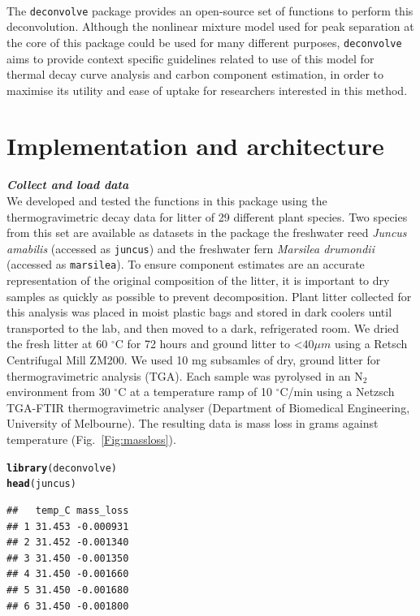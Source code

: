 \documentclass{jors}\usepackage[]{graphicx}\usepackage[]{color}
\makeatletter
\newcommand{\hlstd}[1]{\textcolor[rgb]{0.345,0.345,0.345}{#1}}%
\newcommand{\hlkwd}[1]{\textcolor[rgb]{0.737,0.353,0.396}{\textbf{#1}}}%
\newenvironment{kframe}{%
 \def\at@end@of@kframe{}%
 \ifinner\ifhmode%
  \def\at@end@of@kframe{\end{minipage}}%
  \begin{minipage}{\columnwidth}%
 \fi\fi%
 \def\FrameCommand##1{\hskip\@totalleftmargin \hskip-\fboxsep
 \colorbox{shadecolor}{##1}\hskip-\fboxsep
     \hskip-\linewidth \hskip-\@totalleftmargin \hskip\columnwidth}%
 \MakeFramed {\advance\hsize-\width
   \@totalleftmargin\z@ \linewidth\hsize
   \@setminipage}}%
 {\par\unskip\endMakeFramed%
 \at@end@of@kframe}
\newenvironment{knitrout}{}{} %
\makeatother
\begin{document}
\\
The \verb|deconvolve| package provides an open-source set of functions to perform this deconvolution. Although the nonlinear mixture model used for peak separation at the core of this package could be used for many different purposes, \verb|deconvolve| aims to provide context specific guidelines related to use of this model for thermal decay curve analysis and carbon component estimation, in order to maximise its utility and ease of uptake for researchers interested in this method.

\section*{Implementation and architecture}

\textbf{\textit{Collect and load data}}\\
We developed and tested the functions in this package using the thermogravimetric decay data for litter of 29 different plant species. Two species from this set are available as datasets in the package \textemdash the freshwater reed \textit{Juncus amabilis} (accessed as \verb|juncus|) and the freshwater fern \textit{Marsilea drumondii} (accessed as \verb|marsilea|). To ensure component estimates are an accurate representation of the original composition of the litter, it is important to dry samples as quickly as possible to prevent decomposition. Plant litter collected for this analysis was placed in moist plastic bags and stored in dark coolers until transported to the lab, and then moved to a dark, refrigerated room. We dried the fresh litter at 60 $^{\circ}$C for 72 hours and ground litter to \textless $40 \mu m$ using a Retsch Centrifugal Mill ZM200. We used 10 mg subsamles of dry, ground litter for thermogravimetric analysis (TGA). Each sample was pyrolysed in an N$_2$ environment from 30 $^{\circ}$C at a temperature ramp of 10 $^{\circ}$C/min using a Netzsch TGA-FTIR thermogravimetric analyser (Department of Biomedical Engineering, University of Melbourne). The resulting data is mass loss in grams against temperature (Fig.~\ref{Fig:massloss}).

\begin{knitrout}\footnotesize
{}\color{fgcolor}\begin{kframe}
\begin{alltt}
\hlkwd{library}\hlstd{(deconvolve)}
\hlkwd{head}\hlstd{(juncus)}
\end{alltt}
\begin{verbatim}
##   temp_C mass_loss
## 1 31.453 -0.000931
## 2 31.452 -0.001340
## 3 31.450 -0.001350
## 4 31.450 -0.001660
## 5 31.450 -0.001680
## 6 31.450 -0.001800
\end{verbatim}
\end{kframe}
\end{knitrout}
\end{document}
